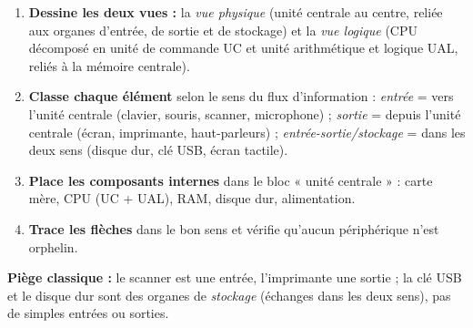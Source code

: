 \documentclass[11pt]{article}
\begin{document}
\begin{methode}
\begin{enumerate}
\item \textbf{Dessine les deux vues :} la \emph{vue physique} (unité centrale au centre, reliée aux organes d'entrée, de sortie et de stockage) et la \emph{vue logique} (CPU décomposé en unité de commande UC et unité arithmétique et logique UAL, reliés à la mémoire centrale).
\item \textbf{Classe chaque élément} selon le sens du flux d'information : \emph{entrée} = vers l'unité centrale (clavier, souris, scanner, microphone) ; \emph{sortie} = depuis l'unité centrale (écran, imprimante, haut-parleurs) ; \emph{entrée-sortie/stockage} = dans les deux sens (disque dur, clé USB, écran tactile).
\item \textbf{Place les composants internes} dans le bloc « unité centrale » : carte mère, CPU (UC + UAL), RAM, disque dur, alimentation.
\item \textbf{Trace les flèches} dans le bon sens et vérifie qu'aucun périphérique n'est orphelin.
\end{enumerate}
\textbf{Piège classique :} le scanner est une entrée, l'imprimante une sortie ; la clé USB et le disque dur sont des organes de \emph{stockage} (échanges dans les deux sens), pas de simples entrées ou sorties.
\end{methode}
\end{document}
